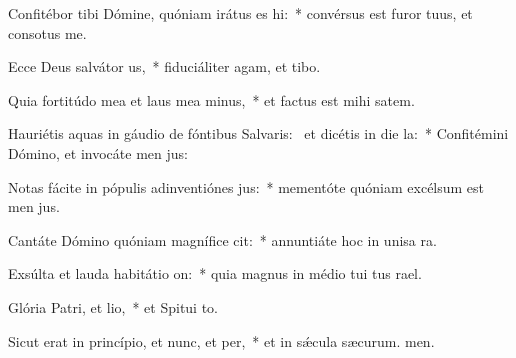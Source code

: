 \item Confitébor tibi Dómine, quóniam irátus es hi:~* convérsus est furor tuus, et consotus  me.
\item Ecce Deus salvátor us,~* fiduciáliter agam, et  tibo.
\item Quia fortitúdo mea et laus mea minus,~* et factus est mihi  satem.
\item Hauriétis aquas in gáudio de fóntibus Salvaris:~\pscross{} et dicétis in die la:~* Confitémini Dómino, et invocáte men jus:
\item Notas fácite in pópulis adinventiónes jus:~* mementóte quóniam excélsum est men jus.
\item Cantáte Dómino quóniam magnífice cit:~* annuntiáte hoc in unisa ra.
\item Exsúlta et lauda habitátio on:~* quia magnus in médio tui tus rael.
\item Glória Patri, et lio,~* et Spitui to.
\item Sicut erat in princípio, et nunc, et per,~* et in sǽcula sæcurum. men.
